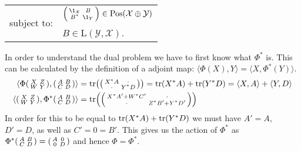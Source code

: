 \documentclass[boxes,pages,color=SeaGreen]{homework}
\newcommand{\X}{\mathcal{X}}
\newcommand{\Y}{\mathcal{Y}}
\newcommand{\Lin}{\mathrm{L}}
\newcommand{\Pos}{\mathrm{Pos}}
\begin{document}
\begin{solution}
\begin{center}
\begin{tabular}{rl}
            \multirow{2}{*}{subject to:}     & $\spmqty{\1_\X                                                        & B \\ B^* & \1_Y} \in \Pos(\X\oplus\Y)$                         \\
                                             & $B\in\Lin(\Y, \X)$.
        \end{tabular}
    \end{center}
    In order to understand the dual problem we have to first know what $\Phi^*$ is.
    This can be calculated by the definition of a adjoint map: $\langle\Phi(X), Y\rangle = \langle X, \Phi^*(Y)\rangle$.
    \begin{align*}
        \langle\Phi\spmqty{X & Z \\ W & Y}, \spmqty{A & B \\ C & D}\rangle & = \tr(\spmqty{X^*A & \cdot \\ \cdot & Y^*D}) = \tr(X^*A) + \tr(Y^*D) = \langle X, A\rangle + \langle Y , D \rangle \\
        \langle\spmqty{X     & Z \\ W & Y}, \Phi^*\spmqty{A & B \\ C & D}\rangle & = \tr(\spmqty{X^*A' + W^*C' & \cdot \\ \cdot & Z^*B' + Y^*D'})
    \end{align*}
    In order for this to be equal to $\tr(X^*A) + \tr(Y^*D)$ we must have $A' = A$, $D' = D$, as well as $C' = 0 = B'$.
    This gives us the action of $\Phi^*$ as $\Phi^*\smqty(A & B \\ C & D) = \smqty(A & 0 \\ 0 & D)$ and hence $\Phi = \Phi^*$.


\end{solution}
\end{document}
